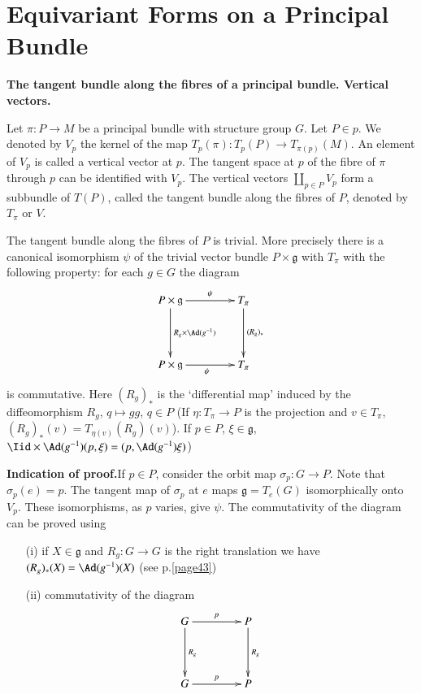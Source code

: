 \section{Equivariant Forms on a Principal Bundle}\label{sec11}

{\bf The tangent bundle along the fibres of a principal bundle. Vertical vectors.}

Let $\pi:P\to M$ be a principal bundle with structure group $G$. Let $P\in p$. We denoted by $V_{p}$ the kernel of the map $T_{p}(\pi):T_{p}(P)\to T_{\pi(p)}(M)$. An element of $V_{p}$ is called a vertical vector at $p$. The tangent space at $p$ of the fibre of $\pi$ through $p$ can be identified with $V_{p}$. The vertical vectors $\coprod\limits_{p\in P}V_{p}$ form a subbundle of $T(P)$, called the tangent bundle along the fibres of $P$, denoted by $T_{\pi}$ or $V$.

\begin{proposition}\label{sec11-prop11.1}
The tangent bundle along the fibres of $P$ is trivial. More precisely there is a canonical isomorphism $\psi$ of the trivial vector bundle $P\times \mathfrak{g}$ with $T_{\pi}$ with the following property: for each $g\in G$ the diagram
\[
\xymatrix@=1.5cm{
P\times \mathfrak{g}\ar[d]^{R_{g}\times \Ad (g^{-1})}\ar[r]^-{\psi} & T_{\pi}\ar[d]^{(R_{g})_{*}}\\
P\times \mathfrak{g}\ar[r]_{\psi} & T_{\pi}
}
\]
is commutative. Here $(R_{g})_{*}$ is the `differential map' induced by the diffeomorphism $R_{g}$, $q\mapsto gg$, $q\in P$ (If $\eta:T_{\pi}\to P$ is the projection and $v\in T_{\pi}$, $(R_{g})_{*}(v)=T_{\eta(v)}(R_{g})(v)$). If $p\in P$, $\xi\in \mathfrak{g}$, $\Iid\times \Ad (g^{-1})(p,\xi)=(p,\Ad(g^{-1})\xi)$)
\end{proposition}

\noindent
{\bf Indication of proof.}\pageoriginale If $p\in P$, consider the orbit map $\sigma_{p}:G\to P$. Note that $\sigma_{p}(e)=p$. The tangent map of $\sigma_{p}$ at $e$ maps $\mathfrak{g}=T_{e}(G)$ isomorphically onto $V_{p}$. These isomorphisms, as $p$ varies, give $\psi$. The commutativity of the diagram can be proved using
\begin{itemize}
\item[(i)] if $X\in \mathfrak{g}$ and $R_{g}:G\to G$ is the right translation we have $(R_{g})_{*}(X)=\Ad(g^{-1})(X)$ (see p.\ref{page43})

\item[(ii)] commutativity of the diagram
\[
\xymatrix@=1.5cm{
G\ar[d]^{R_{g}} \ar[r]^{p} & P\ar[d]^{R_{g}}\\
G\ar[r]^{p} & P
}
\]

\end{itemize}

